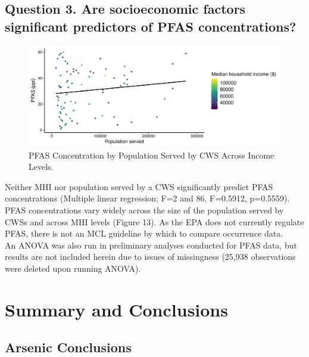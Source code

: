 \documentclass[12pt,]{article}
\begin{document}
\begin{quote}
\end{quote}

\hypertarget{question-3.-are-socioeconomic-factors-significant-predictors-of-pfas-concentrations}{%
\subsection{Question 3. Are socioeconomic factors significant predictors
of PFAS
concentrations?}\label{question-3.-are-socioeconomic-factors-significant-predictors-of-pfas-concentrations}}

\begin{figure}
\centering
\includegraphics{Project_Template_files/figure-latex/figs13-1.pdf}
\caption{PFAS Concentration by Population Served by CWS Across Income
Levels.}
\end{figure}

Neither MHI nor population served by a CWS significantly predict PFAS
concentrations (Multiple linear regression; F=2 and 86, F=0.5912,
p=0.5559). PFAS concentrations vary widely across the size of the
population served by CWSs and across MHI levels (Figure 13). As the EPA
does not currently regulate PFAS, there is not an MCL guideline by which
to compare occurrence data.\\
An ANOVA was also run in preliminary analyses conducted for PFAS data,
but results are not included herein due to issues of missingness (25,938
observations were deleted upon running ANOVA).

\newpage

\hypertarget{summary-and-conclusions}{%
\section{Summary and Conclusions}\label{summary-and-conclusions}}

\hypertarget{arsenic-conclusions}{%
\subsection{Arsenic Conclusions}\label{arsenic-conclusions}}
\end{document}
